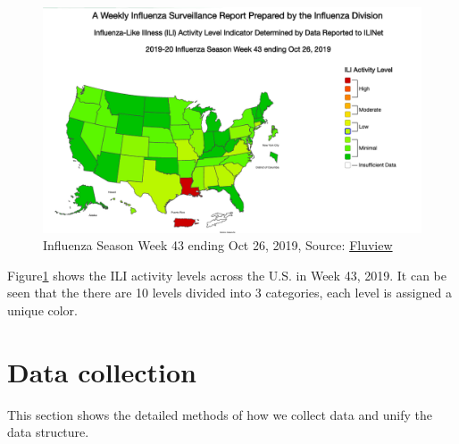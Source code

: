 \begin{figure}[!htbp]
   \center
   \includegraphics[width=6in]{images/week43.png}
   \caption{Influenza Season Week 43 ending Oct 26, 2019, Source: \href{https://www.cdc.gov/flu/weekly/index.htm\#ILIActivityMap}{Fluview}}
   \label{fig:fluView}
\end{figure}
Figure\ref{fig:fluView} shows the ILI activity levels across the U.S. in Week 43, 2019. It can be seen that the there are 10 levels divided into 3 categories, each level is assigned a unique color.

\section{Data collection}
\label{sec:Data collection}
This section shows the detailed methods of how we collect data and unify the data structure. 
